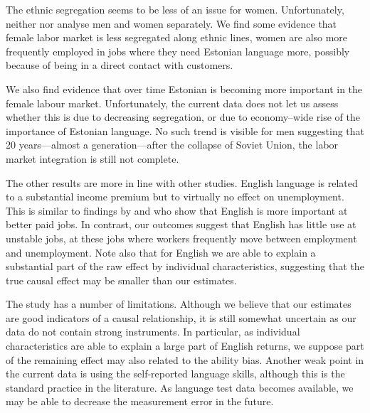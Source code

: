 \documentclass[12pt, a4paper]{article}
\begin{document}
The ethnic segregation seems to be less of an issue for women.
Unfortunately, neither \citet{Toomet2011} nor
\citet{leppik+vihalemm2015JofBaltStud} analyse men and women
separately.  We find some evidence that female labor market is less
segregated along ethnic lines, women are also more frequently employed
in jobs where they need Estonian
language more, possibly because of being in a direct contact with customers.

We also find evidence that over time Estonian is becoming more
important in the female labour market.  Unfortunately, the current data
does not let us assess whether this is due to decreasing segregation,
or due to
economy--wide rise of the importance of Estonian language.  No such trend is visible for
men suggesting that 20 years---almost a generation---after the collapse of Soviet Union, the
labor market integration is still not complete.

The other results are more in line with other studies.
English language is related to a substantial income premium but
to virtually no effect on unemployment.  This is similar to findings by
\citet{ginsburgh+prieto-rodriguez2011ILRR} and
\citet{fabo+2017E} who show that English is more important at better paid
jobs.  In contrast, our outcomes suggest that English has little use
at unstable jobs, at these jobs where workers frequently move between
employment and unemployment.
Note also that for
English we are able to explain a substantial part of the raw effect
by individual characteristics, suggesting that the true causal effect
may be smaller than our estimates.

The study has a number of limitations.  Although we believe that our
estimates are good indicators of a causal relationship, it is still
somewhat uncertain as our data do not contain strong instruments.
In particular, as individual characteristics are able to explain a
large part of English returns, we suppose part of the remaining effect
may also related to the ability bias.  Another weak point in the current
data is using the self-reported language
skills, although this is the standard practice in the literature.  As language test data becomes available, we may be able to
decrease the measurement error in the future.




\clearpage
\appendix


\listoffixmes
\end{document}
